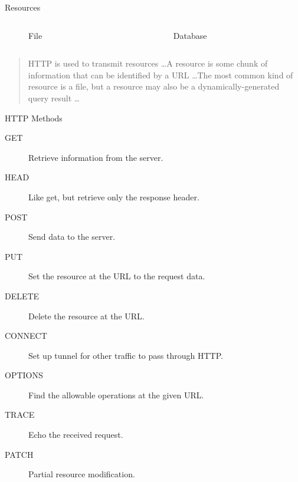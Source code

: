 \begin{frame}{Resources}
 \begin{columns}[onlytextwidth]
   \begin{column}{0.5\textwidth}
     \centering
      \begin{figure}
        \caption*{File}
      \end{figure}
    \end{column}
    \begin{column}{0.5\textwidth}
      \centering
      \begin{figure}
      \caption*{Database}
      \end{figure}
    \end{column}
  \end{columns}
  
  \begin{quote}
    HTTP is used to transmit resources \ldots A resource is some chunk of information that can be identified by a URL \ldots The most common kind of resource is a file, but a resource may also be a dynamically-generated query result \ldots
  \end{quote}
\end{frame}


\begin{frame}{HTTP Methods}
  \begin{description}
    \item[GET] Retrieve information from the server.
    \item[HEAD] Like get, but retrieve only the response header.
    \item[POST] Send data to the server.
    \item[PUT] Set the resource at the URL to the request data.
    \item[DELETE] Delete the resource at the URL.
    \item[CONNECT] Set up tunnel for other traffic to pass through HTTP.
    \item[OPTIONS] Find the allowable operations at the given URL.
    \item[TRACE] Echo the received request.
    \item[PATCH] Partial resource modification.
  \end{description}
\end{frame}

